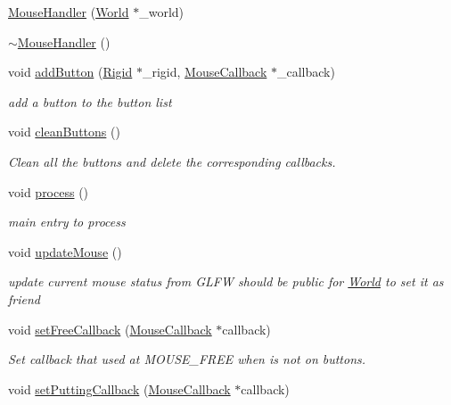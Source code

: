 \begin{DoxyCompactItemize}
\item 
\hyperlink{classMouseHandler_a2c79a128cb7e48f556cb228a3b14f291}{Mouse\+Handler} (\hyperlink{classWorld}{World} $\ast$\+\_\+world)
\item 
\hyperlink{classMouseHandler_a316de94666a31919abaadbb3ff16a18f}{$\sim$\+Mouse\+Handler} ()
\item 
void \hyperlink{classMouseHandler_a27fd9eb5eba52764d5ff6245018ee228}{add\+Button} (\hyperlink{classRigid}{Rigid} $\ast$\+\_\+rigid, \hyperlink{classMouseCallback}{Mouse\+Callback} $\ast$\+\_\+callback)
\begin{DoxyCompactList}\small\item\em add a button to the button list \end{DoxyCompactList}\item 
void \hyperlink{classMouseHandler_aece2b15ab5c31a8cc1befc5f18133f27}{clean\+Buttons} ()
\begin{DoxyCompactList}\small\item\em Clean all the buttons and delete the corresponding callbacks. \end{DoxyCompactList}\item 
void \hyperlink{classMouseHandler_a367ef9b85ee425a85beefdbd16a39768}{process} ()
\begin{DoxyCompactList}\small\item\em main entry to process \end{DoxyCompactList}\item 
void \hyperlink{classMouseHandler_a0a7df02e71fbbb14f5a80163ee065c8b}{update\+Mouse} ()
\begin{DoxyCompactList}\small\item\em update current mouse status from G\+L\+F\+W should be public for \hyperlink{classWorld}{World} to set it as friend \end{DoxyCompactList}\item 
void \hyperlink{classMouseHandler_a24de5aaed3df346eae098cd830f168dd}{set\+Free\+Callback} (\hyperlink{classMouseCallback}{Mouse\+Callback} $\ast$callback)
\begin{DoxyCompactList}\small\item\em Set callback that used at M\+O\+U\+S\+E\+\_\+\+F\+R\+E\+E when is not on buttons. \end{DoxyCompactList}\item 
void \hyperlink{classMouseHandler_a8b2e24e7199d4a33562c87b50f135fb2}{set\+Putting\+Callback} (\hyperlink{classMouseCallback}{Mouse\+Callback} $\ast$callback)

\end{DoxyCompactItemize}
